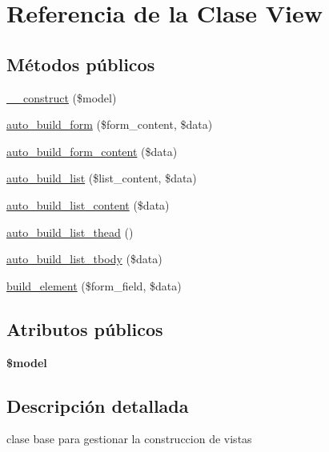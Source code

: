 \hypertarget{class_view}{}\section{Referencia de la Clase View}
\label{class_view}
\subsection*{Métodos públicos}
\begin{DoxyCompactItemize}
\item 
\mbox{\hyperlink{class_view_a946a646ca1bb866acdbde73a28f33993}{\+\_\+\+\_\+construct}} (\$model)
\item 
\mbox{\hyperlink{class_view_a450c3cc299b4e42b3e6499b783a3ad6d}{auto\+\_\+build\+\_\+form}} (\$form\+\_\+content, \$data)
\item 
\mbox{\hyperlink{class_view_a8ab136103e7ca8c850c409e2b7dd92e2}{auto\+\_\+build\+\_\+form\+\_\+content}} (\$data)
\item 
\mbox{\hyperlink{class_view_afff2bf095f5152f4b9074da8c656581f}{auto\+\_\+build\+\_\+list}} (\$list\+\_\+content, \$data)
\item 
\mbox{\hyperlink{class_view_a74d1701b5981346a27394c9b7002cb06}{auto\+\_\+build\+\_\+list\+\_\+content}} (\$data)
\item 
\mbox{\hyperlink{class_view_ac55cd1801295517a7f9fad0d41ddf6d1}{auto\+\_\+build\+\_\+list\+\_\+thead}} ()
\item 
\mbox{\hyperlink{class_view_aaf8b264482d9d19af83177579be7ba3e}{auto\+\_\+build\+\_\+list\+\_\+tbody}} (\$data)
\item 
\mbox{\hyperlink{class_view_ab2f8d0f1c16e7971856e5535d9fc286e}{build\+\_\+element}} (\$form\+\_\+field, \$data)
\end{DoxyCompactItemize}
\subsection*{Atributos públicos}
\begin{DoxyCompactItemize}
\item 
\mbox{\label{class_view_aee47ec7896001294011782441f74e771}} 
{\bfseries \$model}
\end{DoxyCompactItemize}


\subsection{Descripción detallada}
clase base para gestionar la construccion de vistas 

